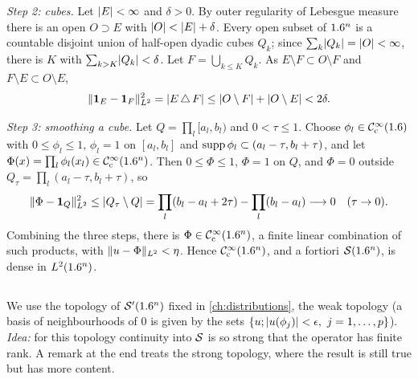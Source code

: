 \emph{Step 2: cubes.} Let $\lvert E\rvert<\infty$ and $\delta>0$. By outer regularity of Lebesgue
measure there is an open $O\supset E$ with $\lvert O\rvert<\lvert E\rvert+\delta$. Every open subset of
$1.6^n$ is a countable disjoint union of half-open dyadic cubes $Q_k$; since
$\sum_k\lvert Q_k\rvert=\lvert O\rvert<\infty$, there is $K$ with $\sum_{k>K}\lvert Q_k\rvert<\delta$. Let
$F=\bigcup_{k\le K}Q_k$. As $E\setminus F\subset O\setminus F$ and $F\setminus E\subset O\setminus E$,
\begin{equation*}
  \lVert \mathbf 1_E-\mathbf 1_F\rVert_{L^2}^2=\lvert E\,\triangle\,F\rvert\le\lvert O\setminus F\rvert+\lvert O\setminus E\rvert<2\delta.
\end{equation*}

\emph{Step 3: smoothing a cube.} Let $Q=\prod_l[a_l,b_l)$ and $0<\tau\le1$. Choose
$\phi_l\in\mathcal{C}^\infty_{\mathrm{c}}(1.6)$ with $0\le\phi_l\le1$, $\phi_l=1$ on $[a_l,b_l]$ and
$\operatorname{supp}\phi_l\subset(a_l-\tau,b_l+\tau)$, and let $\Phi(x)=\prod_l\phi_l(x_l)\in\mathcal{C}^\infty_{\mathrm{c}}(1.6^n)$.
Then $0\le\Phi\le1$, $\Phi=1$ on $Q$, and $\Phi=0$ outside
$Q_\tau=\prod_l(a_l-\tau,b_l+\tau)$, so
\begin{equation*}
  \lVert \Phi-\mathbf 1_Q\rVert_{L^2}^2\le\lvert Q_\tau\setminus Q\rvert
  =\prod_l(b_l-a_l+2\tau)-\prod_l(b_l-a_l)\longrightarrow0\quad(\tau\to0).
\end{equation*}
Combining the three steps, there is $\Phi\in\mathcal{C}^\infty_{\mathrm{c}}(1.6^n)$, a finite linear combination of
such products, with $\lVert u-\Phi\rVert_{L^2}<\eta$. Hence $\mathcal{C}^\infty_{\mathrm{c}}(1.6^n)$, and a fortiori
$\mathcal{S}(1.6^n)$, is dense in $L^2(1.6^n)$.

\subsection*{}

We use the topology of $\mathcal{S}'(1.6^n)$ fixed in \cref{ch:distributions}, the weak topology
(a basis of neighbourhoods of $0$ is given by the sets
$\{u;\abs{u(\phi_j)}<\eps,\ j=1,\dots,p\}$). \emph{Idea:} for this topology continuity
into $\mathcal{S}$ is so strong that the operator has finite rank. A remark at the end treats the
strong topology, where the result is still true but has more content.


